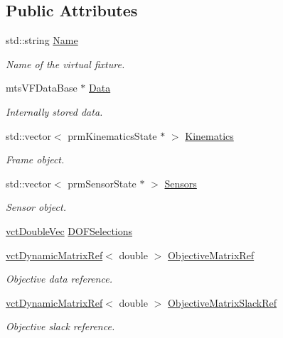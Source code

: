 \subsection*{Public Attributes}
\begin{DoxyCompactItemize}
\item 
std\-::string \hyperlink{classmts_v_f_base_ab8c00c15a86f7df135f985e10983065e}{Name}
\begin{DoxyCompactList}\small\item\em Name of the virtual fixture. \end{DoxyCompactList}\item 
mts\-V\-F\-Data\-Base $\ast$ \hyperlink{classmts_v_f_base_a7ea78be3ece9d1ca77763d4640fa28f0}{Data}
\begin{DoxyCompactList}\small\item\em Internally stored data. \end{DoxyCompactList}\item 
std\-::vector$<$ prm\-Kinematics\-State $\ast$ $>$ \hyperlink{classmts_v_f_base_ad68e05d7529b31405ab7efc74a2dbeaa}{Kinematics}
\begin{DoxyCompactList}\small\item\em Frame object. \end{DoxyCompactList}\item 
std\-::vector$<$ prm\-Sensor\-State $\ast$ $>$ \hyperlink{classmts_v_f_base_aaa45dda5c29d0b4b4b097988fea04ed5}{Sensors}
\begin{DoxyCompactList}\small\item\em Sensor object. \end{DoxyCompactList}\item 
\hyperlink{vct_dynamic_vector_types_8h_ade4b3068c86fb88f41af2e5187e491c2}{vct\-Double\-Vec} \hyperlink{classmts_v_f_base_a5b1e01809d1f9f8486e5c582e651f1e5}{D\-O\-F\-Selections}
\item 
\hyperlink{classvct_dynamic_matrix_ref}{vct\-Dynamic\-Matrix\-Ref}$<$ double $>$ \hyperlink{classmts_v_f_base_ac4da2ed51e5b51a104ad0949457aaadb}{Objective\-Matrix\-Ref}
\begin{DoxyCompactList}\small\item\em Objective data reference. \end{DoxyCompactList}\item 
\hyperlink{classvct_dynamic_matrix_ref}{vct\-Dynamic\-Matrix\-Ref}$<$ double $>$ \hyperlink{classmts_v_f_base_a97679c797cd0099833eab17d255be220}{Objective\-Matrix\-Slack\-Ref}
\begin{DoxyCompactList}\small\item\em Objective slack reference. \end{DoxyCompactList}\item 

\end{DoxyCompactItemize}
